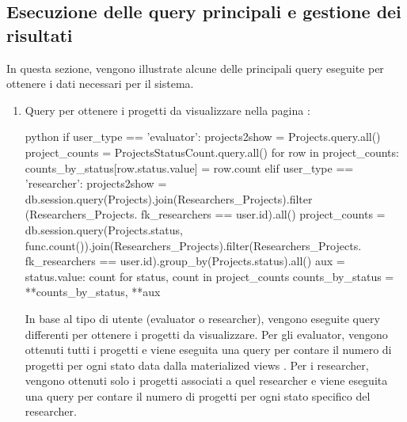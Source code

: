 \documentclass{report}
\begin{document}
\subsection{Esecuzione delle query principali e gestione dei risultati}
In questa sezione, vengono illustrate alcune delle principali query eseguite per ottenere i dati necessari per il sistema. 
\begin{enumerate}
\item Query per ottenere i progetti da visualizzare nella pagina :\\
\begin{minipage}{\linewidth}
\begin{imtaCode}{python}
if user_type == 'evaluator':
    projects2show = Projects.query.all()
    project_counts = ProjectsStatusCount.query.all()
    for row in project_counts:
        counts_by_status[row.status.value] = row.count
elif user_type == 'researcher':
    projects2show = db.session.query(Projects).join(Researchers_Projects).filter (Researchers_Projects. fk_researchers == user.id).all()
    project_counts = db.session.query(Projects.status, func.count()).join(Researchers_Projects).filter(Researchers_Projects. fk_researchers == user.id).group_by(Projects.status).all()
    aux = {status.value: count for status, count in project_counts}
    counts_by_status = {**counts_by_status, **aux}
     \end{imtaCode}
\end{minipage}
In base al tipo di utente (evaluator o researcher), vengono eseguite query differenti per ottenere i progetti da visualizzare. Per gli evaluator, vengono ottenuti tutti i progetti e viene eseguita una query per contare il numero di progetti per ogni stato data dalla materialized views . Per i researcher, vengono ottenuti solo i progetti associati a quel researcher e viene eseguita una query per contare il numero di progetti per ogni stato specifico del researcher.


\end{enumerate}
\end{document}

